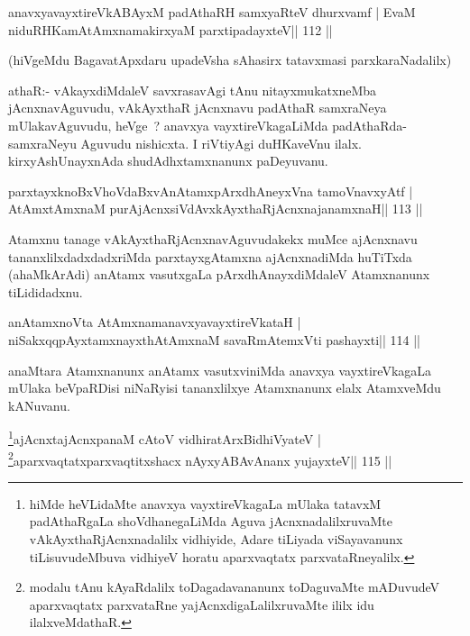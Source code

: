 \begin{shl}
anavxyavayxtireVkABAyxM padAthaRH samxyaRteV dhurxvamf |
EvaM niduRHKamAtAmxnamakirxyaM parxtipadayxteV\hfill || 112 ||
\end{shl}

\begin{artha}
(hiVgeMdu BagavatApxdaru upadeVsha sAhasirx tatavxmasi
  parxkaraNadalilx) 
\end{artha}

\begin{artha}
athaR:- vAkayxdiMdaleV savxrasavAgi tAnu nitayxmukatxneMba jAcnxnavAguvudu, vAkAyxthaR jAcnxnavu padAthaR samxraNeya mUlakavAguvudu, heVge~? anavxya vayxtireVkagaLiMda padAthaRda-samxraNeyu Aguvudu nishicxta. I riVtiyAgi duHKaveVnu ilalx. kirxyAshUnayxnAda shudAdhxtamxnanunx paDeyuvanu.
\end{artha}

\centerline{}



\begin{shl}
parxtayxknoBxVhoVdaBxvAnAtamxpArxdhAneyxVna tamoVnavxyAtf |
AtAmx\s\s tAmxnaM purA\s jAcnxsiVdAvxkAyxthaRjAcnxnajanamxnaH\hfill || 113 ||
\end{shl}

\begin{artha}
Atamxnu tanage vAkAyxthaRjAcnxnavAguvudakekx muMce ajAcnxnavu tananxlilxdadxdadxriMda parxtayxgAtamxna ajAcnxnadiMda huTiTxda (ahaMkArAdi) anAtamx vasutxgaLa pArxdhAnayxdiMdaleV Atamxnanunx tiLididadxnu.
\end{artha}

\begin{shl}
anAtamxnoV\s ta AtAmxnamanavxyavayxtireVkataH |
niSakxqqpAyx\s\s tamxnayxthA\s\s tAmxnaM savaRmAtemxVti pashayxti\hfill || 114 ||
\end{shl}

\begin{artha}
anaMtara Atamxnanunx anAtamx vasutxviniMda anavxya vayxtireVkagaLa mUlaka beVpaRDisi niNaRyisi tananxlilxye Atamxnanunx elalx AtamxveMdu kANuvanu.
\end{artha}

\begin{shl}
\footnote{hiMde heVLidaMte anavxya vayxtireVkagaLa mUlaka tatavxM padAthaRgaLa shoVdhanegaLiMda Aguva jAcnxnadalilxruvaMte vAkAyxthaRjAcnxnadalilx vidhiyide, Adare tiLiyada viSayavanunx tiLisuvudeMbuva vidhiyeV horatu aparxvaqtatx parxvataRneyalilx.}ajAcnxtajAcnxpanaM cAtoV vidhiratArxBidhiVyateV |
\footnote{modalu tAnu kAyaRdalilx toDagadavananunx toDaguvaMte mADuvudeV aparxvaqtatx parxvataRne yajAcnxdigaLalilxruvaMte ililx idu ilalxveMdathaR.}aparxvaqtatxparxvaqtitxshacx nAyxyABAvAnanx yujayxteV\hfill || 115 ||
\end{shl}


